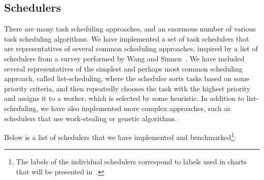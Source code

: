 %

\subsection{Schedulers}
\label{subsec:estee-schedulers}
There are many task scheduling approaches, and an enormous number of various task scheduling
algorithms. We have implemented a set of task schedulers that are representatives of several common
scheduling approaches, inspired by a list of schedulers from a survey performed by Wang and
Sinnen~\cite{wang2018list}. We have included several representatives of the simplest and
perhaps most common scheduling approach, called list-scheduling, where the scheduler sorts tasks
based on some priority criteria, and then repeatedly chooses the task with the highest priority and
assigns it to a worker, which is selected by some heuristic. In addition to list-scheduling, we
have also implemented more complex approaches, such as schedulers that use work-stealing or genetic
algorithms.

Below is a list of schedulers that we have implemented and benchmarked\footnote{The labels of the individual schedulers correspond to labels used in charts that will be presented
in~.}:

